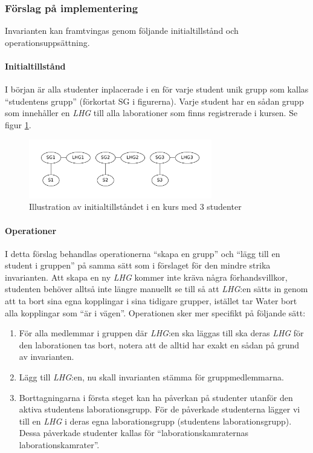 \subsubsection{Förslag på implementering}
Invarianten kan  framtvingas genom följande initialtillstånd och operationsuppsättning.

\paragraph{Initialtillstånd}
I början är alla studenter inplacerade i en för varje student unik grupp som kallas “studentens grupp” (förkortat SG i figurerna). Varje student har en sådan grupp som innehåller en \emph{LHG} till alla laborationer som finns registrerade i kursen. Se figur \ref{fig:strict-initstate}.

\begin{figure}
  \centering
  \includegraphics[width=8.0cm]{fig/labgroup/strict_initstate.pdf}
  \caption{Illustration av initialtillståndet i en kurs med 3 studenter}\label{fig:strict-initstate}
\end{figure}

\paragraph{Operationer}
I detta förslag behandlas operationerna “skapa en grupp” och “lägg till en student i gruppen” på samma sätt som i förslaget för den mindre strika invarianten. Att skapa en ny \emph{LHG} kommer inte kräva några förhandsvillkor, studenten behöver alltså inte längre manuellt se till så att \emph{LHG}:en sätts in genom att ta bort sina egna kopplingar i sina tidigare grupper, istället tar Water bort alla kopplingar som “är i vägen”. Operationen sker mer specifikt på följande sätt:
\begin{enumerate}
  \item För alla medlemmar i gruppen där \emph{LHG}:en ska läggas till ska
    deras \emph{LHG} för den laborationen tas bort, notera att de alltid har
    exakt en sådan på grund av invarianten.
  \item Lägg till \emph{LHG}:en, nu skall invarianten stämma för gruppmedlemmarna.
  \item Borttagningarna i första steget kan ha påverkan på studenter utanför
  den aktiva studentens laborationsgrupp. För de påverkade studenterna lägger
  vi till en \emph{LHG} i  deras egna laborationsgrupp (studentens laborationsgrupp).
  Dessa påverkade studenter kallas för “laborationskamraternas
  laborationskamrater”.

\end{enumerate}

